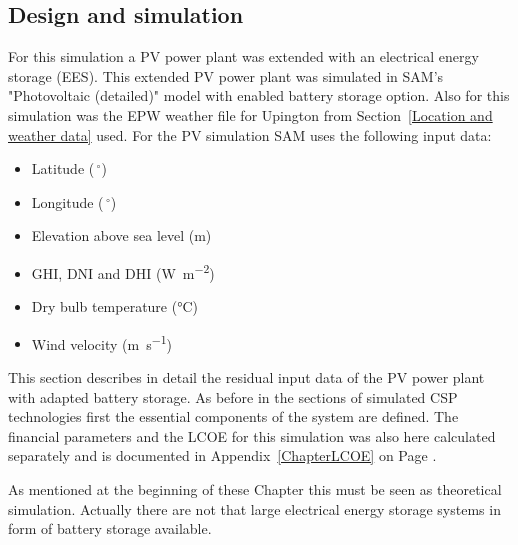 \subsection{Design and simulation} \label{section PV system}
For this simulation a PV power plant was extended with an electrical energy storage (EES). This extended PV power plant was simulated in SAM's "Photovoltaic (detailed)" model with enabled battery storage option. Also for this simulation was the EPW weather file for Upington from Section~\ref{Location and weather data} used. For the PV simulation SAM uses the following input data:
\begin{itemize}
\item Latitude ($\,^{\circ}$)
\item Longitude ($\,^{\circ}$)
\item Elevation above sea level (\si{\metre})
\item GHI, DNI and DHI (\si{\watt\per\square\metre})
\item Dry bulb temperature (\si{\celsius})
\item Wind velocity (\si{\metre\per\second})
\end{itemize}
This section describes in detail the residual input data of the PV power plant with adapted battery storage. As before in the sections of simulated CSP technologies first the essential components of the system are defined. The financial parameters and the LCOE for this simulation was also here calculated separately and is documented in Appendix~\ref{ChapterLCOE} on Page \pageref{ChapterLCOE}.



As mentioned at the beginning of these Chapter this must be seen as theoretical simulation. Actually there are not that large electrical energy storage systems in form of battery storage available.



